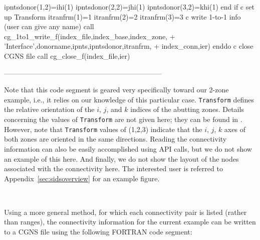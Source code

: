 \documentclass[12pt]{article}
\begin{document}
{\newline\indent\indent\indent      ipntsdonor(1,2)=ihi(1)
\newline\indent\indent\indent      ipntsdonor(2,2)=jhi(1)
\newline\indent\indent\indent      ipntsdonor(3,2)=khi(1)
\newline\indent\indent   end if
\newline c   set up Transform
\newline\indent\indent      itranfrm(1)=1
\newline\indent\indent      itranfrm(2)=2
\newline\indent\indent      itranfrm(3)=3
\newline c   write 1-to-1 info (user can give any name)
\newline\indent\indent   call cg\_1to1\_write\_f(index\_file,index\_base,index\_zone,
\newline\indent + \indent 'Interface',donorname,ipnts,ipntsdonor,itranfrm,
\newline\indent + \indent index\_conn,ier)
\newline\indent      enddo
\newline c  close CGNS file
\newline\indent      call cg\_close\_f(index\_file,ier)}

--------------------------------------------------------------------

\noindent Note that this code segment is geared very specifically 
toward our 2-zone example, i.e., it relies on our
knowledge of this particular case.  {\tt Transform} defines the
relative orientation of the $i$, $j$, and $k$ indices of the
abutting zones.  Details concerning the
values of {\tt Transform} are not given here; they can be found in
\cite{ALLMARAS}.  However, note that {\tt Transform} values of 
(1,2,3) indicate that the $i$, $j$, $k$ axes of both zones
are oriented in the same directions.  Reading the connectivity information 
can also be easily accomplished using
API calls, but we do not show an example of this here.
And finally, we do not show the layout of the nodes associated with
the connectivity here.  The interested user is referred to 
Appendix~\ref{sec:sidsoverview} for an example figure.

~

\noindent{}

Using a more general method, for which each connectivity pair is
listed (rather than ranges),
the connectivity information for the current example
can be written to a CGNS file using the following
FORTRAN code segment:
\end{document}
